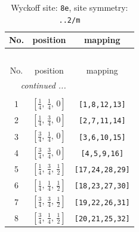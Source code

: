 \documentclass[fleqn,8pt]{jsarticle}
\begin{document}
\begin{longtable}{ccc}
\caption{Wyckoff site: {\tt 8e}, site symmetry: {\tt ..2/m}}
 \\
 \hline \hline
No. & position & mapping \\ \hline \endfirsthead

\multicolumn{2}{l}{\tablename\ \thetable{}} \\
 \hline \hline
No. & position & mapping \\ \hline \endhead

 \hline \hline
\multicolumn{2}{r}{\footnotesize\it continued ...} \\ \endfoot

 \hline \hline
\multicolumn{2}{r}{} \\ \endlastfoot

1 & $\left[ \frac{1}{4},\, \frac{1}{4},\, 0 \right]$ & {\tt [1,8,12,13]} \\ \hline
2 & $\left[ \frac{1}{4},\, \frac{3}{4},\, 0 \right]$ & {\tt [2,7,11,14]} \\ \hline
3 & $\left[ \frac{3}{4},\, \frac{1}{4},\, 0 \right]$ & {\tt [3,6,10,15]} \\ \hline
4 & $\left[ \frac{3}{4},\, \frac{3}{4},\, 0 \right]$ & {\tt [4,5,9,16]} \\ \hline
5 & $\left[ \frac{1}{4},\, \frac{3}{4},\, \frac{1}{2} \right]$ & {\tt [17,24,28,29]} \\ \hline
6 & $\left[ \frac{1}{4},\, \frac{1}{4},\, \frac{1}{2} \right]$ & {\tt [18,23,27,30]} \\ \hline
7 & $\left[ \frac{3}{4},\, \frac{3}{4},\, \frac{1}{2} \right]$ & {\tt [19,22,26,31]} \\ \hline
8 & $\left[ \frac{3}{4},\, \frac{1}{4},\, \frac{1}{2} \right]$ & {\tt [20,21,25,32]} \\
\end{longtable}
\renewcommand{\arraystretch}{1.2}
\end{document}
